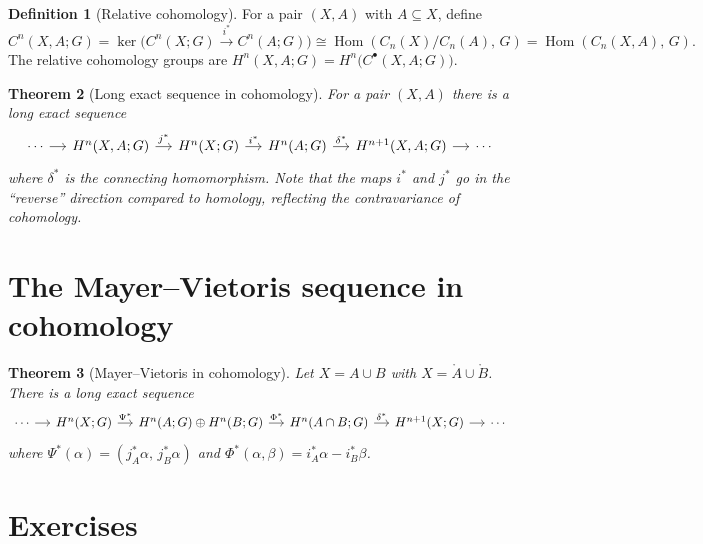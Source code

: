 \documentclass[12pt,a4paper,openany]{book}
\theoremstyle{definition}
\newtheorem{definition}{Definition}[chapter]
\theoremstyle{plain}
\newtheorem{theorem}[definition]{Theorem}
\theoremstyle{remark}
\DeclareMathOperator{\Hom}{Hom}
\begin{document}
\begin{definition}[Relative cohomology]
For a pair $(X,A)$ with $A\subseteq X$, define
\[
  C^n(X,A;G) = \ker\bigl(C^n(X;G)\xrightarrow{i^*} C^n(A;G)\bigr)
  \cong \Hom(C_n(X)/C_n(A),\,G) = \Hom(C_n(X,A),\,G).
\]
The relative cohomology groups are
$H^n(X,A;G) = H^n\bigl(C^\bullet(X,A;G)\bigr)$.
\end{definition}

\begin{theorem}[Long exact sequence in cohomology]
\label{thm:les-cohomology}
For a pair $(X,A)$ there is a long exact sequence
\[
\begin{tikzcd}[column sep=small]
  \cdots \ar[r]
  & H^n(X,A;G) \ar[r,"j^*"]
  & H^n(X;G) \ar[r,"i^*"]
  & H^n(A;G) \ar[r,"\delta^*"]
  & H^{n+1}(X,A;G) \ar[r]
  & \cdots
\end{tikzcd}
\]
where $\delta^*$ is the connecting homomorphism. Note that the maps
$i^*$ and $j^*$ go in the ``reverse'' direction compared to homology,
reflecting the contravariance of cohomology.
\end{theorem}

\section{The Mayer--Vietoris sequence in cohomology}
\label{sec:mv-cohomology}

\begin{theorem}[Mayer--Vietoris in cohomology]\label{thm:mv-cohomology}
Let $X = A\cup B$ with $X=\mathring{A}\cup\mathring{B}$. There is a
long exact sequence
\[
\begin{tikzcd}[column sep=small]
  \cdots \ar[r]
  & H^n(X;G) \ar[r,"\Psi^*"]
  & H^n(A;G)\oplus H^n(B;G) \ar[r,"\Phi^*"]
  & H^n(A\cap B;G) \ar[r,"\delta^*"]
  & H^{n+1}(X;G) \ar[r]
  & \cdots
\end{tikzcd}
\]
where $\Psi^*(\alpha)=(j_A^*\alpha,\,j_B^*\alpha)$ and
$\Phi^*(\alpha,\beta) = i_A^*\alpha - i_B^*\beta$.
\end{theorem}

\section{Exercises}
\label{sec:coh-exercises}
\end{document}
